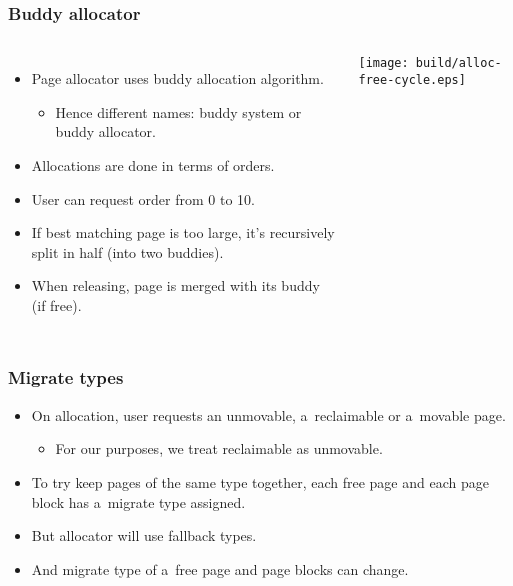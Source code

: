 \begin{frame}
  \frametitle{Buddy allocator}
  \begin{columns}[c]

    \begin{itemize}
    \item Page allocator uses buddy allocation algorithm.
      \begin{itemize}
      \item Hence different names: buddy system or buddy allocator.
      \end{itemize}
    \item Allocations are done in terms of orders.
    \item User can request order from 0 to 10.
    \item If best matching page is too large, it's recursively split
      in half (into two buddies).
    \item When releasing, page is merged with its buddy (if free).
    \end{itemize}

    \begin{center}
    \texttt{[image: build/alloc-free-cycle.eps]}
    \end{center}
  \end{columns}
\end{frame}

\begin{frame}[fragile]
  \frametitle{Migrate types}

  \begin{itemize}
  \item On allocation, user requests an unmovable, a~reclaimable or
    a~movable page.
    \begin{itemize}
    \item For our purposes, we treat reclaimable as unmovable.
    \end{itemize}
  \item To try keep pages of the same type together, each free page
    and each page block has a~migrate type assigned.
  \item But allocator will use fallback types.
  \item And migrate type of a~free page and page blocks can change.
  \end{itemize}
\end{frame}

